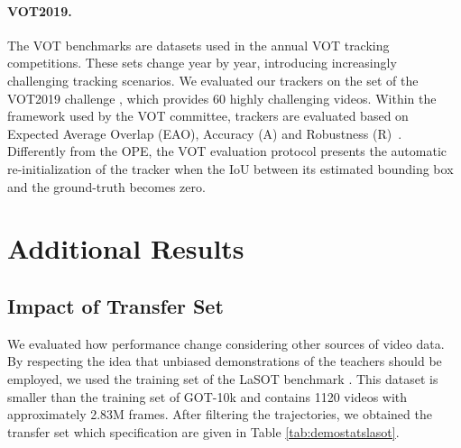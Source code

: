 \documentclass[runningheads]{llncs}
\begin{document}
\paragraph{VOT2019.}
The VOT benchmarks are datasets used in the annual VOT tracking competitions. These sets change year by year, introducing increasingly challenging tracking scenarios. 
We evaluated our trackers on the set of the VOT2019 challenge \cite{VOT2019}, which provides 60 highly challenging videos.
Within the framework used by the VOT committee, trackers are evaluated based on Expected Average Overlap (EAO), Accuracy (A) and Robustness (R)~\cite{VOT}. Differently from the OPE, the VOT evaluation protocol presents the automatic re-initialization of the tracker when the IoU between its estimated bounding box and the ground-truth becomes zero.



\section{Additional Results}

\subsection{Impact of Transfer Set}
We evaluated how performance change considering other sources of video data. By respecting the idea that unbiased demonstrations of the teachers should be employed, we used the training set of the LaSOT benchmark \cite{LaSOT}. This dataset is smaller than the training set of GOT-10k and contains 1120 videos with approximately 2.83M frames. After filtering the trajectories, we obtained the transfer set  which specification are given in Table \ref{tab:demostatslasot}.
\end{document}
